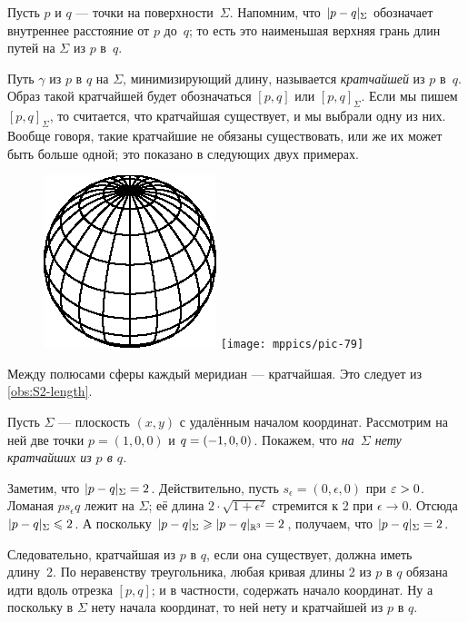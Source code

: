 Пусть $p$ и $q$ --- точки на поверхности~$\Sigma$.
Напомним, что $\dist{p}{q}\Sigma$ обозначает внутреннее расстояние от $p$ до~$q$;
то есть это наименьшая верхняя грань длин путей на $\Sigma$ из $p$ в~$q$.

Путь $\gamma$ из $p$ в $q$ на $\Sigma$, минимизирующий длину, называется \emph{кратчайшей} из $p$ в~$q$.
Образ такой кратчайшей будет обозначаться $[p,q]$ или $[p,q]_\Sigma$.
Если мы пишем $[p,q]_\Sigma$, то считается, что кратчайшая существует, и мы выбрали одну из них.
Вообще говоря, такие кратчайшие не обязаны существовать, или же их может быть больше одной;
это показано в следующих двух примерах.

\begin{figure}
\vskip-6mm
\centering
\includegraphics{asy/sphere}
\bigskip
\texttt{[image: mppics/pic-79]}
\end{figure}

Между полюсами сферы каждый меридиан --- кратчайшая.
Это следует из \ref{obs:S2-length}.

Пусть $\Sigma$ --- плоскость $(x,y)$ с удалённым началом координат.
Рассмотрим на ней две точки $p=(1,0,0)$ и $q\z=(-1,0,0)$.
Покажем, что \textit{на~$\Sigma$ нету кратчайших из $p$ в $q$.}

Заметим, что $\dist{p}{q}\Sigma=2$. 
Действительно, пусть $s_\epsilon=(0,\epsilon,0)$ при $\epsilon\z>0$.
Ломаная $ps_\epsilon q$ лежит на $\Sigma$;
её длина $2\cdot\sqrt{1+\epsilon^2}$ стремится к 2 при $\epsilon\to0$.
Отсюда $\dist{p}{q}\Sigma\le 2$.
А поскольку $\dist{p}{q}\Sigma\z\ge \dist{p}{q}{\mathbb{R}^3}=2$, получаем, что $\dist{p}{q}\Sigma=2$.

Следовательно, кратчайшая из $p$ в $q$, если она существует, должна иметь длину~2.
По неравенству треугольника, любая кривая длины 2 из $p$ в $q$ обязана идти вдоль отрезка $[p,q]$;
и в частности, содержать начало координат.
Ну а поскольку в $\Sigma$ нету начала координат, то ней нету и кратчайшей из $p$ в $q$. 


